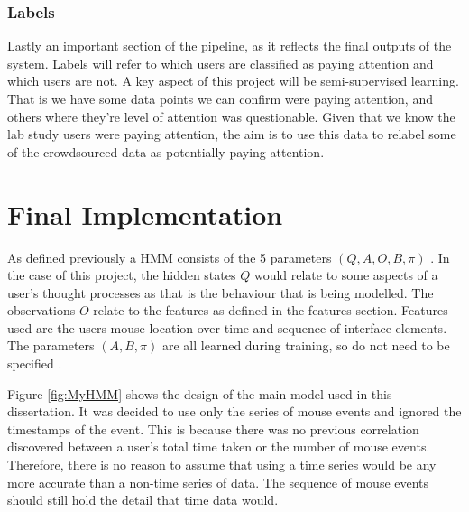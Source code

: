 \documentclass{article}
\begin{document}
\subsubsection{Labels}


Lastly an important section of the pipeline, as it reflects the final outputs of the system.
Labels will refer to which users are classified as paying attention and which users are not.
A key aspect of this project will be semi-supervised learning.
That is we have some data points we can confirm were paying attention, and others where they're level of attention was questionable.
Given that we know the lab study users were paying attention, the aim is to use this data to relabel some of the crowdsourced data as potentially paying attention.



\section{Final Implementation}


As defined previously a HMM consists of the 5 parameters $(Q,A,O,B,\pi)$ \cite{jurafsky2018speech}.
In the case of this project, the hidden states $Q$ would relate to some aspects of a user's thought processes as that is the behaviour that is being modelled.
The observations $O$ relate to the features as defined in the features section.
Features used are the users mouse location over time and sequence of interface elements.
The parameters $(A,B,\pi)$ are all learned during training, so do not need to be specified \cite{porwal2013machine}.

Figure \ref{fig:MyHMM} shows the design of the main model used in this dissertation.
It was decided to use only the series of mouse events and ignored the timestamps of the event. %
This is because there was no previous correlation discovered between a user’s total time taken or the number of mouse events. 
Therefore, there is no reason to assume that using a time series would be any more accurate than a non-time series of data. 
The sequence of mouse events should still hold the detail that time data would.
\end{document}
